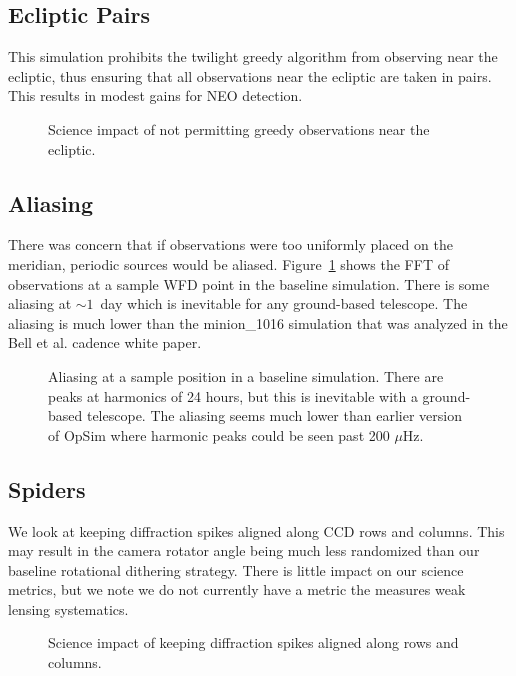 \subsection{Ecliptic Pairs}

This simulation prohibits the twilight greedy algorithm from observing near the ecliptic, thus ensuring that all observations near the ecliptic are taken in pairs. This results in modest gains for NEO detection. 


\begin{figure}
\caption{Science impact of not permitting greedy observations near the ecliptic. }
\end{figure}

\subsection{Aliasing}

There was concern that if observations were too uniformly placed on the meridian, periodic sources would be aliased. Figure~\ref{fig:alias} shows the FFT of observations at a sample WFD point in the baseline simulation. There is some aliasing at $\sim1$\ day which is inevitable for any ground-based telescope.  The aliasing is much lower than the minion\_1016 simulation that was analyzed in the Bell et al. cadence white paper. 

\begin{figure}
\label{fig:alias}
\caption{Aliasing at a sample position in a baseline simulation. There are peaks at harmonics of 24 hours, but this is inevitable with a ground-based telescope. The aliasing seems much lower than earlier version of OpSim where harmonic peaks could be seen past 200 $\mu$Hz.}
\end{figure}


\subsection{Spiders}

We look at keeping diffraction spikes aligned along CCD rows and columns. This may result in the camera rotator angle being much less randomized than our baseline rotational dithering strategy. There is little impact on our science metrics, but we note we do not currently have a metric the measures weak lensing systematics.

\begin{figure}
\caption{Science impact of keeping diffraction spikes aligned along rows and columns. }
\end{figure}

